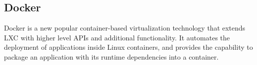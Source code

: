 


\subsection{Docker}

Docker is a new popular container-based virtualization technology that extends LXC
with higher level APIs and additional functionality. It automates the deployment of
applications inside Linux containers, and provides the capability to package an
application with its runtime dependencies into a container.


